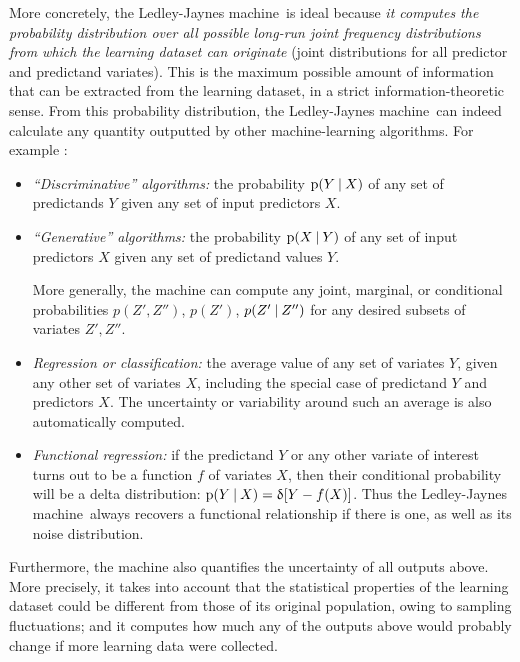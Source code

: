 \documentclass[utf8]{FrontiersinHarvard} %
\newcommand*{\sect}{\S}%
\newcommand*{\eg}{{e.g.}}
\newcommand*{\p}{\mathrm{p}}%
\renewcommand*{\|}[1][]{\nonscript\:#1\vert\nonscript\:\mathopen{}}
\newcommand*{\delt}{\updelta}
\newcommand*{\ljm}{Ledley-Jaynes machine}
\begin{document}
More concretely, the \ljm\ is ideal because \emph{it computes the probability distribution over all possible long-run joint frequency distributions from which the learning dataset can originate} (joint distributions for all predictor and predictand variates). This is the maximum possible amount of information that can be extracted from the learning dataset, in a strict information-theoretic sense. From this probability distribution, the \ljm\ can indeed calculate any quantity outputted by other machine-learning algorithms. For example \citep[for terminology see \eg][\sect~8.6]{murphy2012}:
\begin{itemize}
\item \emph{\enquote{Discriminative} algorithms:} the probability $\p(Y \| X)$ of any set of predictands $Y$ given any set of input predictors $X$.

\item \emph{\enquote{Generative} algorithms:}  the probability $\p(X \| Y)$ of any set of input predictors $X$ given any set of predictand values $Y$.

  More generally, the machine can compute any joint, marginal, or conditional probabilities $p(Z',Z'')$, $p(Z')$, $p(Z'\|Z'')$ for any desired subsets of variates $Z', Z''$.

\item \emph{Regression or classification:} the average value of any set of variates $Y$, given any other set of variates $X$, including the special case of predictand $Y$ and predictors $X$. The uncertainty or variability around such an average is also automatically computed.
  
\item \emph{Functional regression:} if the predictand $Y$ or any other variate of interest turns out to be a function $f$ of variates $X$, then their conditional probability will be a delta distribution: $\p(Y\|X) = \delt[Y-f(X)]$.
  Thus the \ljm\ always recovers a functional relationship if there is one, as well as its noise distribution.
\end{itemize}
Furthermore, the machine also quantifies the uncertainty of all outputs above. More precisely, it takes into account that the statistical properties of the learning dataset could be different from those of its original population, owing to sampling fluctuations; and it computes how much any of the outputs above would probably change if more learning data were collected.
\end{document}
